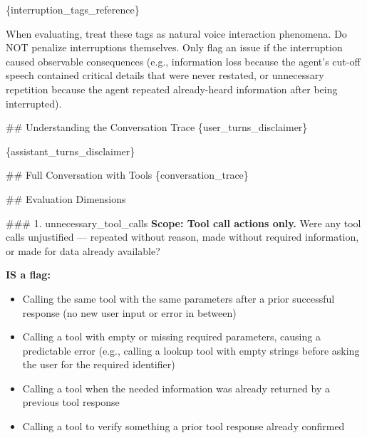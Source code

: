 \begin{tcolorbox}[promptbox, title={\small Conversation Progression Prompt}]
      \{interruption\_tags\_reference\}\newline

      When evaluating, treat these tags as natural voice interaction phenomena. Do NOT penalize interruptions themselves. Only flag an issue if the interruption caused observable consequences (e.g., information loss because the agent's cut-off speech contained critical details that were never restated, or unnecessary repetition because the agent repeated already-heard information after being interrupted).\newline

      \#\# Understanding the Conversation Trace\newline
      \{user\_turns\_disclaimer\}\newline

      \{assistant\_turns\_disclaimer\}\newline

      \#\# Full Conversation with Tools\newline
      \{conversation\_trace\}\newline

      \#\# Evaluation Dimensions\newline

      \#\#\# 1. unnecessary\_tool\_calls\newline
      \textbf{Scope: Tool call actions only.} Were any tool calls unjustified --- repeated without reason, made without required information, or made for data already available?\newline

      \textbf{IS a flag:}
      \begin{itemize}
        \item Calling the same tool with the same parameters after a prior successful response (no new user input or error in between)
        \item Calling a tool with empty or missing required parameters, causing a predictable error (e.g., calling a lookup tool with empty strings before asking the user for the required identifier)
        \item Calling a tool when the needed information was already returned by a previous tool response
        \item Calling a tool to verify something a prior tool response already confirmed
      \end{itemize}


\end{tcolorbox}
